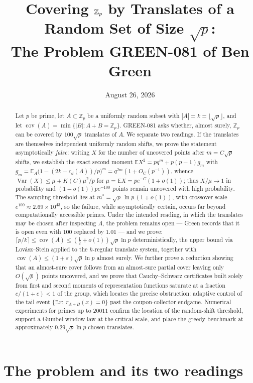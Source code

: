 \documentclass[11pt]{article}
\title{Covering $\Zp$ by Translates of a Random Set of Size $\sqrt p$:\\
The Problem GREEN-081 of Ben Green}
\author{}
\date{August 26, 2026}
\theoremstyle{definition}
\newcommand{\Zp}{\mathbb{Z}_p}
\newcommand{\E}{\mathbb{E}}
\newcommand{\cov}{\operatorname{cov}}
\newcommand{\Var}{\operatorname{Var}}
\begin{document}
\maketitle

\begin{abstract}
Let $p$ be prime, let $A\subset\Zp$ be a uniformly random subset with
$|A|=k=\lfloor\sqrt p\rfloor$, and let
$\cov(A)=\min\{|B| : A+B=\Zp\}$. GREEN-081 asks whether, almost surely,
$\Zp$ can be covered by $100\sqrt p$ translates of $A$. We separate two
readings. If the translates are themselves independent uniformly random
shifts, we prove the statement asymptotically \emph{false}: writing $X$ for
the number of uncovered points after $m=C\sqrt p$ shifts, we establish the
exact second moment
$\E X^2=pq^m+p(p-1)g_m$ with
$g_m=\E_A\bigl(1-(2k-c_d(A))/p\bigr)^m=q^{2m}(1+O_C(p^{-1}))$, whence
$\Var(X)\le \mu+K(C)\mu^2/p$ for $\mu=\E X=pe^{-C}(1+o(1))$; thus
$X/\mu\to1$ in probability and $(1-o(1))pe^{-100}$ points remain uncovered
with high probability. The sampling threshold lies at
$m^\ast=\sqrt p\,\ln p\,(1+o(1))$, with crossover scale $e^{100}\approx
2.69\times10^{43}$, so the failure, while asymptotically certain, occurs far
beyond computationally accessible primes. Under the intended reading, in
which the translates may be chosen after inspecting $A$, the problem remains
open --- Green records that it is open even with $100$ replaced by $1.01$ ---
and we prove: $\lceil p/k\rceil\le\cov(A)\le(\tfrac12+o(1))\sqrt p\ln p$
deterministically, the upper bound via Lov\'asz--Stein applied to the
$k$-regular translate system, together with
$\cov(A)\le(1+\varepsilon)\sqrt p\ln p$ almost surely. We further prove a
reduction showing that an almost-sure cover follows from an almost-sure
partial cover leaving only $O(\sqrt p)$ points uncovered, and we prove that
Cauchy--Schwarz certificates built solely from first and second moments of
representation functions saturate at a fraction $c/(1+c)<1$ of the group,
which locates the precise obstruction: adaptive control of the tail event
$\{\exists x:\ r_{A+B}(x)=0\}$ past the coupon-collector endgame. Numerical
experiments for primes up to $20011$ confirm the location of the random-shift
threshold, support a Gumbel window law at the critical scale, and place the
greedy benchmark at approximately $0.29\sqrt p\ln p$ chosen translates.
\end{abstract}

\section{The problem and its two readings}\label{sec:model}
\end{document}
